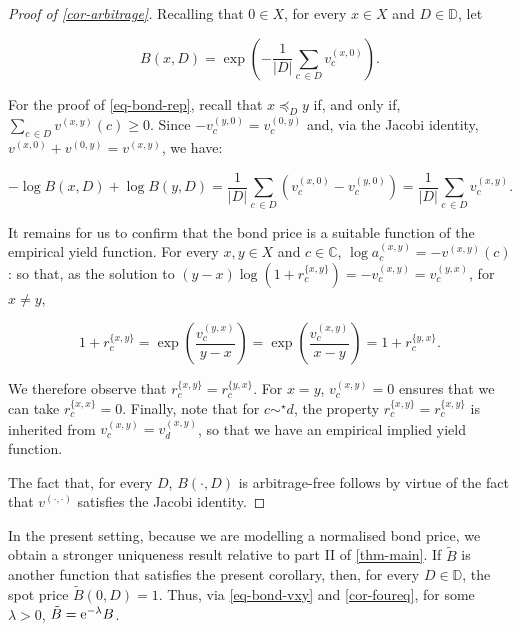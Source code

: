 \documentclass[12pt,a4paper,twoside]{article}
\newcommand{\mbbd}{{\mathds D}}
\newcommand{\mbbc}{{\mathds C}}
\newcommand{\xy}{{(x, y)}}
\newcommand{\yx}{{(y, x)}}
\newcommand{\dd}{{(\cdot,\cdot)}}
\begin{document}
\begin{example}
\begin{proof}[Proof of \cref{cor-arbitrage}]
  Recalling that $0 \in X$, for every $x\in X$ and $D \in \mbbd$, let
  \begin{linenomath*}
    \begin{equation}\label{eq-bond-vxy}
      \textstyle B(x,D) = \exp\left( -\frac{1}{\lvert D \rvert} \sum_{c\,\in D} v^{(x,0)}_{c}
      \right).
      \end{equation}
\end{linenomath*}
For the proof of \eqref{eq-bond-rep}, recall that $x \preceq_{D} y$ if,
and only if, $\sum_{c\,\in D} v^{\xy}(c) \geq 0$. Since
$- v^{(y,0)}_{c} = v^{(0,y)}_{c}$ and, via the Jacobi identity,
$v^{(x,0)} + v^{(0,y)} = v^{\xy}$, we have:
\begin{linenomath*}
  \[\textstyle
    - \log B(x,D) + \log B(y,D) = \frac{1}{\lvert D\rvert} \sum_{c\,\in D}
    \left(v^{(x,0)}_{c} - v^{(y,0)}_{c}\right) = \frac{1}{\lvert D\rvert}
    \sum_{c\,\in D} v^{\xy}_{c}.
\]
\end{linenomath*}
It remains for us to confirm that the bond price is a suitable function of the
empirical yield function. For every $x,y \in X$ and $c \in \mbbc$,
$ \log a^{\xy}_{c} = -v^{\xy}(c)$: so that, as the solution to
$ (y - x )\log (1+r^{\{x,y\}}_{c}) = -v^{\xy}_{c} = v^{\yx}_{c}$, for
$x \neq y$,
\begin{linenomath*}
  \begin{equation}\label{eq-gross-yield-vxy}
    1+ r^{\{x,y\}}_{c} = \exp\left(\frac{v^{\yx}_{c}}{y-x}\right) =
    \exp\left( \frac{v^{\xy}_{c}}{x-y}\right) = 1+r^{\{y,x\}}_{c}.
    \end{equation}
\end{linenomath*}
We therefore observe that $r^{\{x,y\}}_{c} = r^{\{y,x\}}_{c}$. For $x = y$,
$v^{\xy}_{c}= 0$ ensures that we can take $r^{\{x,x\}}_{c} = 0$. Finally, note
that for $c \sim^{\star} d$, the property $r^{\{x,y\}}_{c} = r^{\{x,y\}}_{c}$ is
inherited from $v^{\xy}_{c} = v^{\xy}_{d}$, so that we have an empirical implied
yield function.

The fact that, for every $D$, $B(\cdot, D)$ is arbitrage-free follows by virtue
of the fact that $v^{\dd}$ satisfies the Jacobi identity. 
\end{proof} 
In the present setting, because we are modelling a normalised bond price, we
obtain a stronger uniqueness result relative to part II of \cref{thm-main}. If
$\tilde B$ is another function that satisfies the present corollary, then, for
every $D \in \mbbd$, the spot price $\tilde B(0,D) = 1$. Thus, via
\cref{eq-bond-vxy} and \cref{cor-foureq}, for some $\lambda >0$,
$\tilde B = \textup{e}^{-\lambda} B$.


\end{example}
\end{document}
